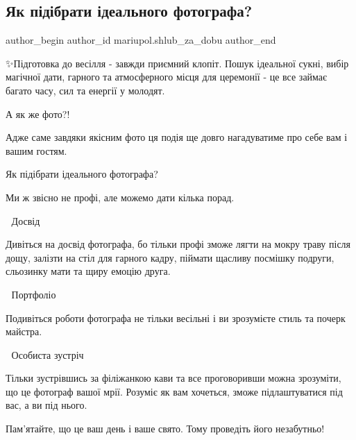  
 
 
 
 

\subsection{Як підібрати ідеального фотографа?}
\label{sec:17_02_2022.fb.mariupol.shlub_za_dobu.1.jak_pidibraty_idealnogo_fotografa}

\ifcmt
 author_begin
   author_id mariupol.shlub_za_dobu
 author_end
\fi

✨Підготовка до весілля - завжди приємний клопіт. Пошук ідеальної сукні, вибір
магічної дати, гарного та атмосферного місця для церемонії - це все займає
багато часу, сил та енергії у молодят.

А як же фото?!

Адже саме завдяки якісним фото ця подія ще довго нагадуватиме про себе вам і
вашим гостям.

Як підібрати ідеального фотографа?

Ми ж звісно не профі, але можемо дати кілька порад.

🖤 Досвід

Дивіться на досвід фотографа, бо тільки профі зможе лягти на мокру траву після
дощу, залізти на стіл для гарного кадру, піймати щасливу посмішку подруги,
сльозинку мати та щиру емоцію друга.

🤍 Портфоліо

Подивіться роботи фотографа не тільки весільні і ви зрозумієте стиль та почерк майстра.

🖤 Особиста зустріч

Тільки зустрівшись за філіжанкою кави та все проговоривши можна зрозуміти, що
це фотограф вашої мрії. Розуміє як вам хочеться, зможе підлаштуватися під вас,
а ви під нього.

Пам'ятайте, що це ваш день і ваше свято. Тому проведіть його незабутньо!

